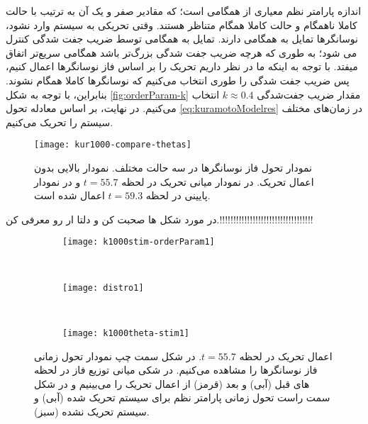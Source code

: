 اندازه پارامتر نظم معیاری از همگامی است؛ که مقادیر صفر و یک آن به ترتیب با حالت کاملا ناهمگام و حالت کاملا همگام متناظر هستند. وقتی تحریکی به سیستم وارد نشود، نوسانگرها تمایل به همگامی دارند. تمایل به همگامی توسط ضریب جفت شدگی کنترل می شود؛ به طوری که هرچه ضریب جفت شدگی بزرگ‌تر باشد همگامی سریع‌تر اتفاق میفتد. با توجه به اینکه ما در نظر داریم تحریک‌ را بر اساس فاز نوسانگرها اعمال کنیم، پس ضریب جفت شدگی را طوری انتخاب می‌کنیم که نوسانگرها کاملا همگام نشوند. بنابراین، با توجه به شکل 
\ref{fig:orderParam-k}
مقدار ضریب جفت‌شدگی 
$k \approx 0.4$
انتخاب می‌کنیم. در نهایت، بر اساس معادله تحول 
\ref{eq:kuramotoModelres}
در زمان‌های مختلف سیستم را تحریک می‌کنیم.

\begin{figure}
	\centering
	\texttt{[image: kur1000-compare-thetas]}
    \caption{
نمودار تحول فاز نوسانگرها در سه حالت مختلف. نمودار بالایی بدون اعمال تحریک. در نمودار میانی تحریک در لحظه 
$t=55.7$
و در نمودار پایینی در لحظه 
$t=59.3$
اعمال شده است.
    }
    \label{fig:kur-compare-thetas}
\end{figure}

در مورد شکل ها صحبت کن و دلتا ار رو معرفی کن.!!!!!!!!!!!!!!!!!!!!!!!!!!!!!!!!!!

\begin{figure}
     \centering
     \begin{subfigure}[t]{0.3\textwidth}
         \centering
         \texttt{[image: k1000stim-orderParam1]}
     \end{subfigure}
     \
     \begin{subfigure}[t]{0.2\textwidth}
         \centering
         \texttt{[image: distro1]}
     \end{subfigure}
     \
     \begin{subfigure}[t]{0.4\textwidth}
         \centering
         \texttt{[image: k1000theta-stim1]}
     \end{subfigure}
        \caption{
اعمال تحریک در لحظه 
$t=55.7$.
در شکل سمت چپ نمودار تحول زمانی فاز نوسانگرها را مشاهده می‌کنیم. در شکی میانی توزیع فاز در لحظه های قبل (آبی) و بعد (قرمز) از اعمال تحریک را می‌بینیم و در شکل سمت راست تحول زمانی پارامتر نظم برای سیستم تحریک شده (آبی) و سیستم تحریک نشده  (سبز).
         }
\end{figure}

